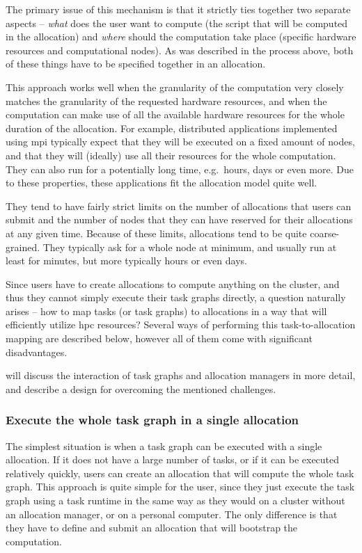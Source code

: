 The primary issue of this mechanism is that it strictly ties together two separate aspects --
\emph{what} does the user want to compute (the script that will be computed in the
allocation) and \emph{where} should the computation take place (specific hardware
resources and computational nodes). As was described in the process above, both of these things
have to be specified together in an allocation.


This approach works well when the granularity of the computation very closely matches the
granularity of the requested hardware resources, and when the computation can make use of all the
available hardware resources for the whole duration of the allocation. For example, distributed
applications implemented using \gls{mpi} typically expect that they will be
executed on a fixed amount of nodes, and that they will (ideally) use all their resources for the
whole computation. They can also run for a potentially long time, e.g.\ hours, days or even more.
Due to these properties, these applications fit the allocation model quite well.

They tend to have fairly strict limits on the number of allocations that users can submit and the
number of nodes that they can have reserved for their allocations at any given time. Because of
these limits, allocations tend to be quite coarse-grained. They typically ask for a whole node at
minimum, and usually run at least for minutes, but more typically hours or even days.

Since users have to create allocations to compute anything on the cluster, and thus they cannot
simply execute their task graphs directly, a question naturally arises -- how to map tasks (or task
graphs) to allocations in a way that will efficiently utilize \gls{hpc}
resources? Several ways of performing this task-to-allocation mapping are described below, however
all of them come with significant disadvantages.

 will discuss the interaction of task graphs and allocation managers in
more detail, and describe a design for overcoming the mentioned challenges.


\subsubsection*{Execute the whole task graph in a single allocation}
The simplest situation is when a task graph can be executed with a single allocation. If it does
not have a large number of tasks, or if it can be executed relatively quickly, users can create an
allocation that will compute the whole task graph. This approach is quite simple for the user,
since they just execute the task graph using a task runtime in the same way as they would on a
cluster without an allocation manager, or on a personal computer. The only difference is that they
have to define and submit an allocation that will bootstrap the computation.

